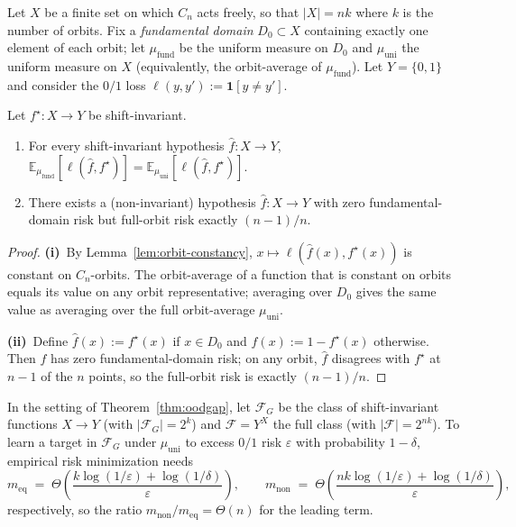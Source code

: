 Let $X$ be a finite set on which $C_n$ acts freely, so that $|X| = n k$
where $k$ is the number of orbits.  Fix a \emph{fundamental domain}
$D_0 \subset X$ containing exactly one element of each orbit; let
$\mu_\mathrm{fund}$ be the uniform measure on $D_0$ and $\mu_\mathrm{uni}$
the uniform measure on $X$ (equivalently, the orbit-average of
$\mu_\mathrm{fund}$).  Let $Y = \{0, 1\}$ and consider the $0/1$ loss
$\ell(y, y') := \mathbf{1}[y \ne y']$.

\begin{theorem}
\label{thm:oodgap}
Let $f^\star : X \to Y$ be shift-invariant.
\begin{enumerate}
  \item[(i)] For every shift-invariant hypothesis $\hat{f} : X \to Y$,
  $\mathbb{E}_{\mu_\mathrm{fund}}[\ell(\hat{f}, f^\star)] =
  \mathbb{E}_{\mu_\mathrm{uni}}[\ell(\hat{f}, f^\star)]$.
  \item[(ii)] There exists a (non-invariant) hypothesis
  $\hat{f} : X \to Y$ with zero fundamental-domain risk but full-orbit
  risk exactly $(n-1)/n$.
\end{enumerate}
\end{theorem}

\begin{proof}
\textbf{(i)}~By Lemma~\ref{lem:orbit-constancy}, $x \mapsto \ell(\hat{f}(x),
f^\star(x))$ is constant on $C_n$-orbits.  The orbit-average of a
function that is constant on orbits equals its value on any orbit
representative; averaging over $D_0$ gives the same value as averaging
over the full orbit-average $\mu_\mathrm{uni}$.

\textbf{(ii)}~Define $\hat{f}(x) := f^\star(x)$ if $x \in D_0$ and
$\hat{f}(x) := 1 - f^\star(x)$ otherwise.  Then $\hat{f}$ has zero
fundamental-domain risk; on any orbit, $\hat{f}$ disagrees with $f^\star$
at $n - 1$ of the $n$ points, so the full-orbit risk is exactly
$(n-1)/n$.
\end{proof}

\begin{corollary}
\label{cor:pac-gap}
In the setting of Theorem~\ref{thm:oodgap}, let $\mathcal{F}_G$ be the
class of shift-invariant functions $X \to Y$ (with
$|\mathcal{F}_G| = 2^k$) and $\mathcal{F} = Y^X$ the full class (with
$|\mathcal{F}| = 2^{nk}$).  To learn a target in $\mathcal{F}_G$ under
$\mu_\mathrm{uni}$ to excess $0/1$ risk $\varepsilon$ with probability
$1 - \delta$, empirical risk minimization needs
\[
  m_\mathrm{eq} \;=\; \Theta\!\left(\frac{k \log(1/\varepsilon) + \log(1/\delta)}{\varepsilon}\right),
  \qquad
  m_\mathrm{non} \;=\; \Theta\!\left(\frac{nk \log(1/\varepsilon) + \log(1/\delta)}{\varepsilon}\right),
\]
respectively, so the ratio $m_\mathrm{non}/m_\mathrm{eq} = \Theta(n)$ for
the leading term.
\end{corollary}

